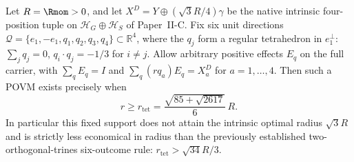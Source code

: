 \documentclass[12pt,a4paper]{article}
\begin{document}
\begin{theorem}
\label{p2c:thm:gc19-antipodal-tetra}
Let $R=\Rmom>0$, and let $X^D=Y\oplus (\sqrt3 R/4)\gamma$
be the native intrinsic four-position tuple on
$\mathcal H_G\oplus\mathcal H_S$ of Paper~II-C. Fix six unit directions
$\mathcal Q=\{e_1,-e_1,q_1,q_2,q_3,q_4\}\subset\mathbb R^4$,
where the $q_j$ form a regular tetrahedron in $e_1^\perp$:
$\sum_jq_j=0$, $q_i\cdot q_j=-1/3$ for $i\ne j$.
Allow arbitrary positive effects $E_q$ on the full carrier, with
$\sum_qE_q=I$ and $\sum_q(rq_a)E_q=X_a^D$ for $a=1,\ldots,4$.
Then such a POVM exists precisely when
\[
\boxed{r\ge r_{\mathrm{tet}}
 =\frac{\sqrt{85+\sqrt{2617}}}{6}\,R.}
\]
In particular this fixed support does not attain the intrinsic optimal
radius $\sqrt3R$ and is strictly less economical in radius than the
previously established two-orthogonal-trines six-outcome rule:
$r_{\mathrm{tet}}>\sqrt{34}R/3$.
\end{theorem}
\end{document}
